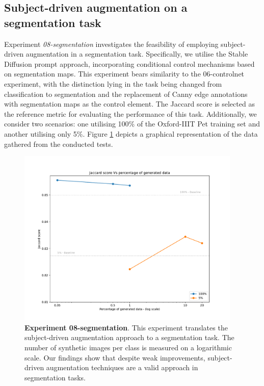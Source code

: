 \subsection{Subject-driven augmentation on a segmentation task} \label{sec: exp-08}

Experiment \textit{08-segmentation} investigates the feasibility of employing subject-driven augmentation in a segmentation task. Specifically, we utilise the Stable Diffusion prompt approach, incorporating conditional control mechanisms based on segmentation maps. This experiment bears similarity to the 06-controlnet experiment, with the distinction lying in the task being changed from classification to segmentation and the replacement of Canny edge annotations with segmentation maps as the control element. The Jaccard score is selected as the reference metric for evaluating the performance of this task. Additionally, we consider two scenarios: one utilising 100\% of the Oxford-IIIT Pet training set and another utilising only 5\%. Figure \ref{fig:exp8} depicts a graphical representation of the data gathered from the conducted tests.

\begin{figure}[ht]
    \centering
    \includegraphics[width=0.95\textwidth]{Pictures/experiment_008.pdf}
    \caption{\textbf{Experiment 08-segmentation}. This experiment translates the subject-driven augmentation approach to a segmentation task. The
number of synthetic images per class is measured on a logarithmic scale. Our findings show that despite weak improvements, subject-driven augmentation techniques are a valid approach in segmentation tasks.}
    \label{fig:exp8}
\end{figure}

